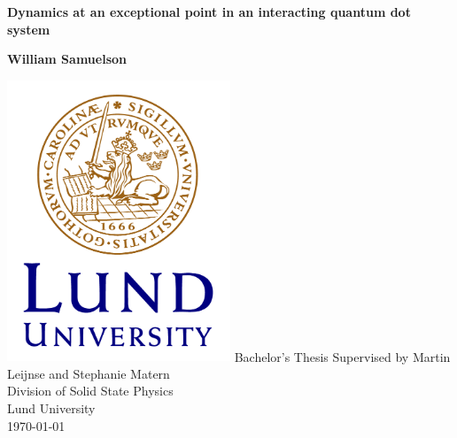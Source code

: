 \documentclass[../main.tex]{subfiles}
\begin{document}
\begin{titlepage}
    \begin{center}
        \vspace*{1cm}
            
        \Huge
        \textbf{Dynamics at an exceptional point in an interacting quantum dot system}
            
        \LARGE
            
        \vspace{1.5cm}
            
        \textbf{William Samuelson}
            
        \vfill

        \includegraphics[width=0.5\textwidth]{figures/LundUniversity_C2line_RGB.png}
        \vfill
        Bachelor's Thesis
        \vfill            
        \Large
        Supervised by Martin Leijnse and Stephanie Matern\\
        \vfill
        Division of 
        Solid State Physics\\
        Lund University\\
        \today
            
    \end{center}
\end{titlepage}
\end{document}
